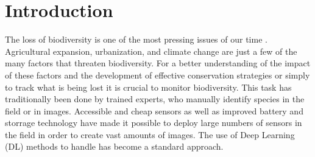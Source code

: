

\section{Introduction}
\label{introduction}

The loss of biodiversity is one of the most pressing issues of our time \autocite{cardinaleBiodiversityLossIts2012}.
Agricultural expansion, urbanization, and climate change are just a few of the many factors that threaten biodiversity.
For a better understanding of the impact of these factors and the development of effective conservation strategies or simply to track what is being lost it is crucial to monitor biodiversity.
This task has traditionally been done by trained experts, who manually identify species in the field or in images.
Accessible and cheap sensors as well as improved battery and storrage technology have made it possible to deploy large numbers of sensors in the field in order to create vast amounts of images.
The use of Deep Learning (DL) methods to handle has become a standard approach.

